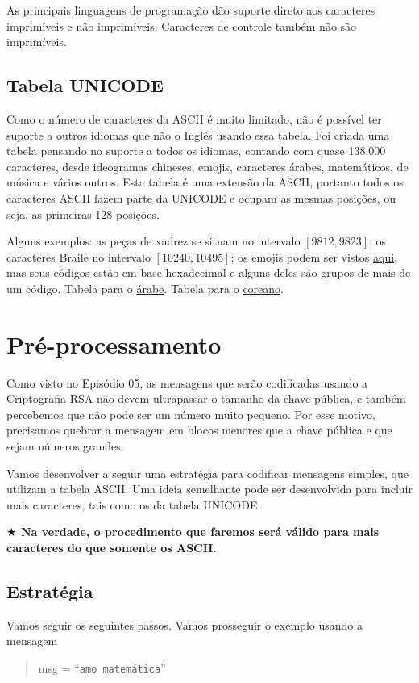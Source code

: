 \documentclass[12pt,a4paper]{article}
\begin{document}
As principais linguagens de programação dão suporte direto aos caracteres imprimíveis e não imprimíveis. Caracteres de controle também não são imprimíveis. 


\subsection{Tabela UNICODE}

Como o número de caracteres da ASCII é muito limitado, não é possível ter suporte a outros idiomas que não o Inglês usando essa tabela. Foi criada uma tabela pensando no suporte a todos os idiomas, contando com quase 138.000 caracteres, desde ideogramas chineses, emojis, caracteres árabes, matemáticos, de música e vários outros. Esta tabela é uma extensão da ASCII, portanto todos os caracteres ASCII fazem parte da UNICODE e ocupam as mesmas posições, ou seja, as primeiras 128 posições.

Alguns exemplos: as peças de xadrez se situam no intervalo $[9812,9823]$; os caracteres Braile no intervalo $[10240,10495]$; os emojis podem ser vistos \href{https://unicode.org/emoji/charts/full-emoji-list.html}{aqui}, mas seus códigos estão em base hexadecimal e alguns deles são grupos de mais de um código. Tabela para o \href{https://en.wikipedia.org/wiki/Arabic_script_in_Unicode}{árabe}. Tabela para o \href{https://en.wikipedia.org/wiki/Hangul_Jamo_(Unicode_block)}{coreano}. 


\section{Pré-processamento}
Como visto no Episódio 05, as mensagens que serão codificadas usando a Criptografia RSA não devem ultrapassar o tamanho da chave pública, e também percebemos que não pode ser um número muito pequeno. Por esse motivo, precisamos quebrar a mensagem em blocos menores que a chave pública e que sejam números grandes.

Vamos desenvolver a seguir uma estratégia para codificar mensagens simples, que utilizam a tabela ASCII. Uma ideia semelhante pode ser desenvolvida para incluir mais caracteres, tais como os da tabela UNICODE.

{\bf $\bigstar$ Na verdade, o procedimento que faremos será válido para mais caracteres do que somente os ASCII.}

\subsection{Estratégia}
Vamos seguir os seguintes passos. Vamos prosseguir o exemplo usando a mensagem
\begin{quote}
msg = ``{\color{red}\verb|amo matemática|}''
\end{quote}
\end{document}
